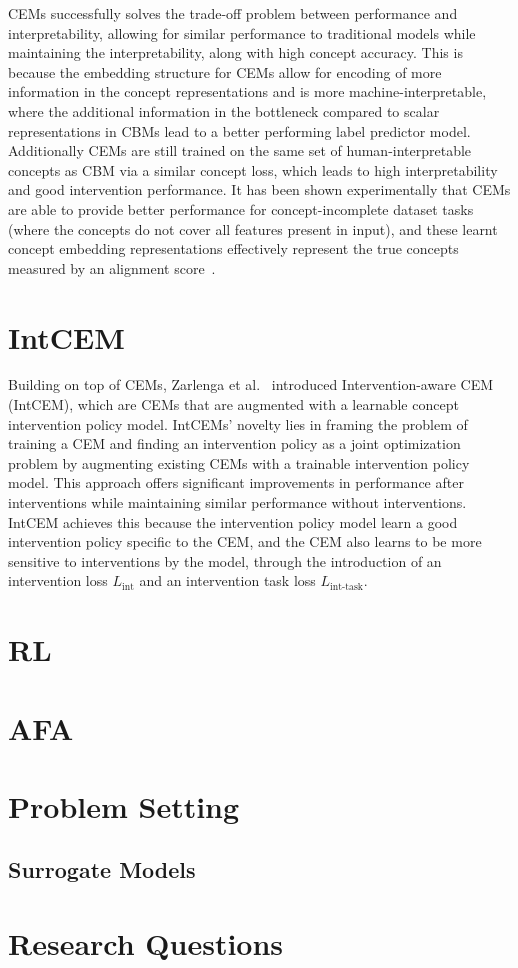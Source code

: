 \documentclass[../main.tex]{subfiles}
\begin{document}
CEMs successfully solves the trade-off problem between performance and interpretability,
allowing for similar performance to traditional models while maintaining the
interpretability, along with high concept accuracy. This is because the embedding structure
for CEMs allow for encoding of more information
in the concept representations and is more machine-interpretable, where
the additional information in the bottleneck
 compared to scalar representations in CBMs
lead to a better performing label predictor model. Additionally CEMs are still trained 
on the same set of human-interpretable concepts as CBM via a similar concept loss, which leads to
high interpretability and good intervention performance. It has been shown experimentally
that CEMs are able to provide better performance for concept-incomplete dataset tasks (where
the concepts do not cover all features present in input), and these learnt concept
embedding representations effectively represent the true concepts measured by an alignment score~\cite{cem}.

\section{IntCEM} %

Building on top of CEMs, Zarlenga et al.~\cite{intcem} introduced 
Intervention-aware CEM (IntCEM), which are CEMs that are augmented
with a learnable concept intervention policy model. IntCEMs' novelty
lies in framing the problem of training a CEM and finding
an intervention policy as a joint optimization problem by augmenting
existing CEMs with a trainable intervention policy model. 
This approach offers significant improvements in performance after 
interventions while maintaining similar performance without 
interventions. 
IntCEM achieves this because the intervention policy model
learn a good intervention policy specific to the CEM, 
and the CEM also learns to be more sensitive to interventions
by the model, through the introduction of an intervention loss 
$L_{\text{int}}$ and an
intervention task loss $L_{\text{int-task}}$.




\section{RL} %

\section{AFA}

\section{Problem Setting} %

\subsection{Surrogate Models} %

\section{Research Questions} %
\end{document}
